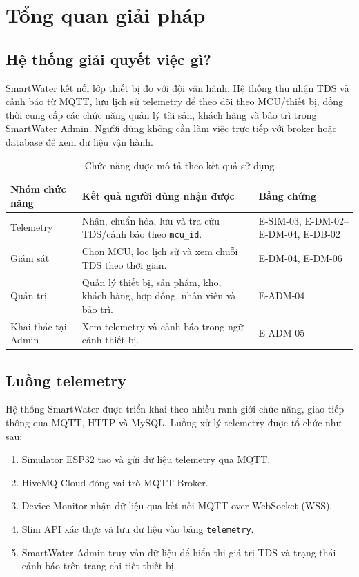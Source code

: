 \chapter{Tổng quan giải pháp}
\label{chap:solution-overview}

\section{Hệ thống giải quyết việc gì?}

SmartWater kết nối lớp thiết bị đo với đội vận hành. Hệ thống thu nhận TDS và cảnh báo từ MQTT, lưu lịch sử telemetry để theo dõi theo MCU/thiết bị, đồng thời cung cấp các chức năng quản lý tài sản, khách hàng và bảo trì trong SmartWater Admin. Người dùng không cần làm việc trực tiếp với broker hoặc database để xem dữ liệu vận hành.

\begin{table}[htbp]
\centering
\small
\begin{tabularx}{\textwidth}{p{}X p{}}
\toprule
\textbf{Nhóm chức năng} & \textbf{Kết quả người dùng nhận được} & \textbf{Bằng chứng} \\
\midrule
Telemetry & Nhận, chuẩn hóa, lưu và tra cứu TDS/cảnh báo theo \texttt{mcu\_id}. & E-SIM-03, E-DM-02--E-DM-04, E-DB-02 \\
Giám sát & Chọn MCU, lọc lịch sử và xem chuỗi TDS theo thời gian. & E-DM-04, E-DM-06 \\
Quản trị & Quản lý thiết bị, sản phẩm, kho, khách hàng, hợp đồng, nhân viên và bảo trì. & E-ADM-04 \\
Khai thác tại Admin & Xem telemetry và cảnh báo trong ngữ cảnh thiết bị. & E-ADM-05 \\
\bottomrule
\end{tabularx}
\caption{Chức năng được mô tả theo kết quả sử dụng}
\label{tab:solution-function-outcomes}
\end{table}

\section{Luồng telemetry}

Hệ thống SmartWater được triển khai theo nhiều ranh giới chức năng, giao tiếp thông qua
MQTT, HTTP và MySQL. Luồng xử lý telemetry được tổ chức như sau:

\begin{enumerate}
    \item Simulator ESP32 tạo và gửi dữ liệu telemetry qua MQTT.
    \item HiveMQ Cloud đóng vai trò MQTT Broker.
    \item Device Monitor nhận dữ liệu qua kết nối MQTT over WebSocket (WSS).
    \item Slim API xác thực và lưu dữ liệu vào bảng \texttt{telemetry}.
    \item SmartWater Admin truy vấn dữ liệu để hiển thị giá trị TDS và trạng thái cảnh báo trên trang chi tiết thiết bị.
\end{enumerate}

